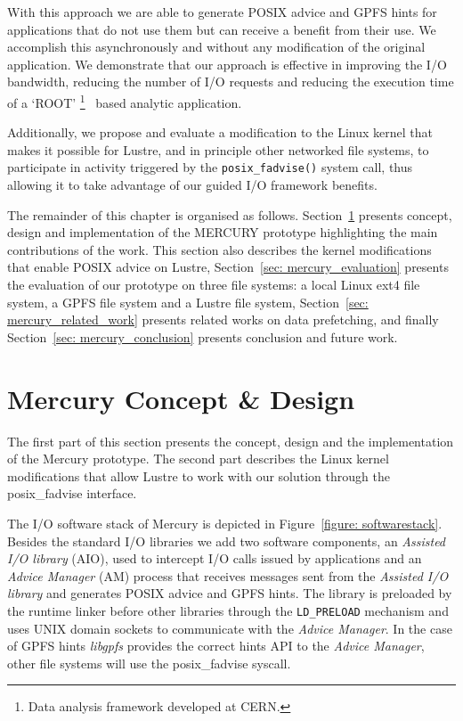 With this approach we are able to generate POSIX advice and GPFS hints for applications that do not use them but can receive a benefit from their use. We accomplish this asynchronously and without any modification of the original application. We demonstrate 
that our approach is effective in improving the I/O bandwidth, reducing the number of I/O requests and reducing the execution time of a `ROOT' \footnote{Data analysis framework developed at CERN.}~\cite{root} based analytic application.

Additionally, we propose and evaluate a modification to the Linux kernel that makes it possible for Lustre, and in principle other networked file systems, to participate in activity triggered by the \texttt{posix\_fadvise()} system call, thus allowing it to 
take advantage of our guided I/O framework benefits.

The remainder of this chapter is organised as follows. Section~\ref{sec: mercury_concept} presents concept, design and implementation of the MERCURY prototype highlighting the main contributions of the work. This section also describes the kernel modifications 
that enable POSIX advice on Lustre, Section~\ref{sec: mercury_evaluation} presents the evaluation of our prototype on three file systems: a local Linux ext4 file system, a GPFS file system and a Lustre file system, Section~\ref{sec: mercury_related_work} presents 
related works on data prefetching, and finally Section~\ref{sec: mercury_conclusion} presents conclusion and future work.

\section{Mercury Concept \& Design}
\label{sec: mercury_concept}
The first part of this section presents the concept, design and the implementation of the Mercury prototype. The second part describes the Linux kernel modifications that allow Lustre to work with our solution through the posix\_fadvise interface.

The I/O software stack of Mercury is depicted in Figure~\ref{figure: softwarestack}. Besides the standard I/O libraries we add two software components, an \textit{Assisted I/O library} (AIO), used to intercept I/O calls issued by applications and an 
\textit{Advice Manager} (AM) process that receives messages sent from the \textit{Assisted I/O library} and generates POSIX advice and GPFS hints. The library is preloaded by the runtime linker before other libraries through the \texttt{LD\_PRELOAD} 
mechanism and uses UNIX domain sockets to communicate with the \textit{Advice Manager}. In the case of GPFS hints \textit{libgpfs} provides the correct hints API to the \textit{Advice Manager}, other file systems will use the posix\_fadvise syscall.

